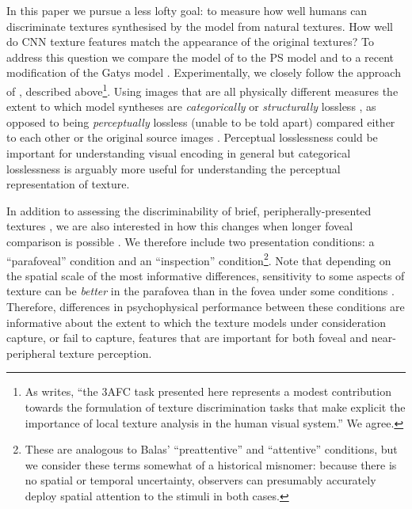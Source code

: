 \documentclass[article, 11pt,a4paper,natbib]{apa6}\usepackage[]{graphicx}\usepackage[]{color}
\begin{document}
In this paper we pursue a less lofty goal: to measure how well humans can discriminate textures synthesised by the \citet{gatys_texture_2015-1} model from natural textures.
How well do CNN texture features match the appearance of the original textures?
To address this question we compare the model of \citet{gatys_texture_2015-1} to the PS model \citep{portilla_parametric_2000} and to a recent modification of the Gatys model \citep{liu_texture_2016}.
Experimentally, we closely follow the approach of \citet{balas_texture_2006}, described above\footnote{As \citet{balas_texture_2006} writes, ``the 3AFC task presented here represents a modest contribution towards the formulation of texture discrimination tasks that make explicit the importance of local texture analysis in the human visual system.'' We agree.}.
Using images that are all physically different measures the extent to which model syntheses are \textit{categorically} or \textit{structurally} lossless \citep[in that they could both be considered samples from original images;][]{pappas_rough_2013}, as opposed to being \textit{perceptually} lossless (unable to be told apart) compared either to each other \citep{freeman_metamers_2011} or the original source images \citep{wallis_testing_2016}.
Perceptual losslessness could be important for understanding visual encoding in general but categorical losslessness is arguably more useful for understanding the perceptual representation of texture.

In addition to assessing the discriminability of brief, peripherally-presented textures \citep[as in][]{balas_texture_2006}, we are also interested in how this changes when longer foveal comparison is possible \citep[as in][]{balas_contrast_2012}.
We therefore include two presentation conditions: a ``parafoveal'' condition and an ``inspection'' condition\footnote{
These are analogous to Balas' ``preattentive'' and ``attentive'' conditions, but we consider these terms somewhat of a historical misnomer: because there is no spatial or temporal uncertainty, observers can presumably accurately deploy spatial attention to the stimuli in both cases.
}.
Note that depending on the spatial scale of the most informative differences, sensitivity to some aspects of texture can be \textit{better} in the parafovea than in the fovea under some conditions \citep{gurnsey_texture_1996,kehrer_perceptual_1987,kehrer_central_1989}. 
Therefore, differences in psychophysical performance between these conditions are informative about the extent to which the texture models under consideration capture, or fail to capture, features that are important for both foveal and near-peripheral texture perception.
\end{document}
